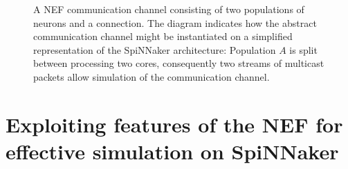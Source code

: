\documentclass[conference]{IEEEtran}
\begin{document}
  \begin{figure}
    \centering
    
    \caption{A NEF communication channel consisting of two populations of neurons and a connection.
    The diagram indicates how the abstract communication channel might be instantiated on a simplified representation of the SpiNNaker architecture:
    Population $A$ is split between processing two cores, consequently two streams of multicast packets allow simulation of the communication channel.
    }
    \label{fig:background/comms-channel}
  \end{figure}

  \section{Exploiting features of the NEF for effective simulation on SpiNNaker}
\end{document}

